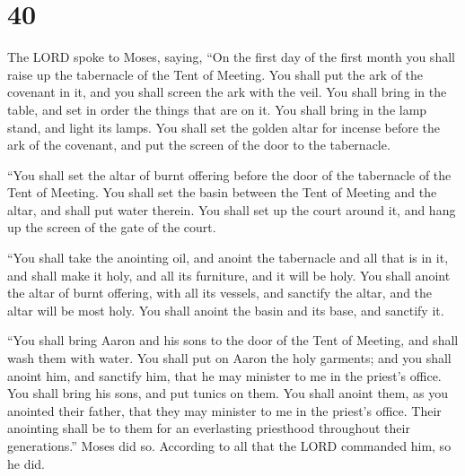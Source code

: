 \hypertarget{section-39}{%
\section{40}\label{section-39}}

 The LORD spoke to Moses, saying,  ``On the
first day of the first month you shall raise up the tabernacle of the
Tent of Meeting.  You shall put the ark of the covenant in
it, and you shall screen the ark with the veil.  You shall
bring in the table, and set in order the things that are on it. You
shall bring in the lamp stand, and light its lamps.  You
shall set the golden altar for incense before the ark of the covenant,
and put the screen of the door to the tabernacle.

 ``You shall set the altar of burnt offering before the door
of the tabernacle of the Tent of Meeting.  You shall set the
basin between the Tent of Meeting and the altar, and shall put water
therein.  You shall set up the court around it, and hang up
the screen of the gate of the court.

 ``You shall take the anointing oil, and anoint the
tabernacle and all that is in it, and shall make it holy, and all its
furniture, and it will be holy.  You shall anoint the altar
of burnt offering, with all its vessels, and sanctify the altar, and the
altar will be most holy.  You shall anoint the basin and
its base, and sanctify it.

 ``You shall bring Aaron and his sons to the door of the
Tent of Meeting, and shall wash them with water.  You shall
put on Aaron the holy garments; and you shall anoint him, and sanctify
him, that he may minister to me in the priest's office. 
You shall bring his sons, and put tunics on them.  You
shall anoint them, as you anointed their father, that they may minister
to me in the priest's office. Their anointing shall be to them for an
everlasting priesthood throughout their generations.'' 
Moses did so. According to all that the LORD commanded him, so he did.

